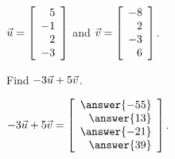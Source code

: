\documentclass{ximera}
\author{Zack Reed}
\begin{document}
  
\begin{exercise}
  $\vect{u}=\startmat{r}
    5 \\
    -1 \\
    2 \\
    -3
  \stopmat$ and 
  $\vect{v}=\startmat{r}
    -8 \\
    2 \\
    -3 \\
    6
  \stopmat$.
  
  Find $-3\vect{u} + 5\vect{v}$.
  
  $-3\vect{u} + 5\vect{v}=\startmat{r}
    \answer{-55} \\
    \answer{13} \\
    \answer{-21} \\
    \answer{39}
  \stopmat$.
  
\end{exercise}
\end{document}
